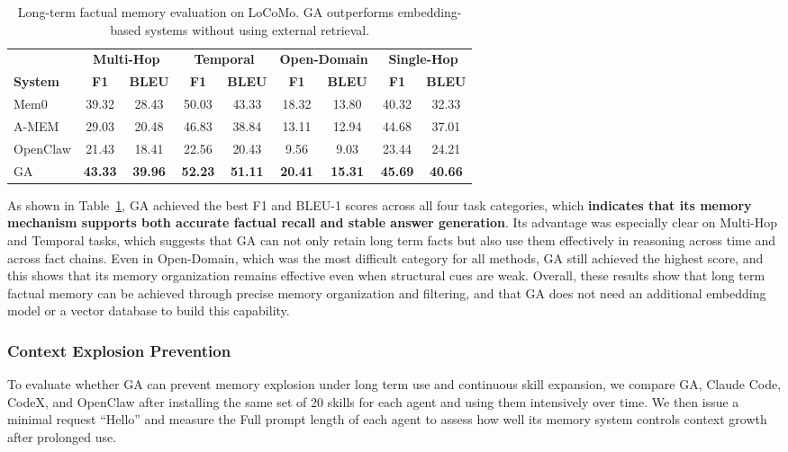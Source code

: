 \begin{table}[t]
\centering
\caption{Long-term factual memory evaluation on LoCoMo. GA outperforms embedding-based systems without using external retrieval.}
\label{tab:long_term_memory}
\begin{tabular}{lcccccccc}
\toprule
& \multicolumn{2}{c}{\textbf{Multi-Hop}} & \multicolumn{2}{c}{\textbf{Temporal}} & \multicolumn{2}{c}{\textbf{Open-Domain}} & \multicolumn{2}{c}{\textbf{Single-Hop}} \\
\cmidrule(lr){2-3} \cmidrule(lr){4-5} \cmidrule(lr){6-7} \cmidrule(lr){8-9}
\textbf{System} & \textbf{F1} & \textbf{BLEU} & \textbf{F1} & \textbf{BLEU} & \textbf{F1} & \textbf{BLEU} & \textbf{F1} & \textbf{BLEU} \\
\midrule
Mem0 & 39.32 & 28.43 & 50.03 & 43.33 & 18.32 & 13.80 & 40.32 & 32.33 \\
A-MEM & 29.03 & 20.48 & 46.83 & 38.84 & 13.11 & 12.94 & 44.68 & 37.01 \\
OpenClaw & 21.43 & 18.41 & 22.56 & 20.43 & 9.56 & 9.03 & 23.44 & 24.21 \\
GA & \textbf{43.33} & \textbf{39.96} & \textbf{52.23} & \textbf{51.11} & \textbf{20.41} & \textbf{15.31} & \textbf{45.69} & \textbf{40.66} \\
\bottomrule
\end{tabular}
\end{table}

As shown in Table~\ref{tab:long_term_memory}, GA achieved the best F1 and BLEU-1 scores across all four task categories, which \textbf{indicates that its memory mechanism supports both accurate factual recall and stable answer generation}. 
Its advantage was especially clear on Multi-Hop and Temporal tasks, which suggests that GA can not only retain long term facts but also use them effectively in reasoning across time and across fact chains. 
Even in Open-Domain, which was the most difficult category for all methods, GA still achieved the highest score, and this shows that its memory organization remains effective even when structural cues are weak. 
Overall, these results show that long term factual memory can be achieved through precise memory organization and filtering, and that GA does not need an additional embedding model or a vector database to build this capability.


\subsubsection{Context Explosion Prevention}
\label{sec:exp_context_explosion}
To evaluate whether GA can prevent memory explosion under long term use and continuous skill expansion, we compare GA, Claude Code, CodeX, and OpenClaw after installing the same set of 20 skills for each agent and using them intensively over time. 
We then issue a minimal request ``Hello'' and measure the Full prompt length of each agent to assess how well its memory system controls context growth after prolonged use.

